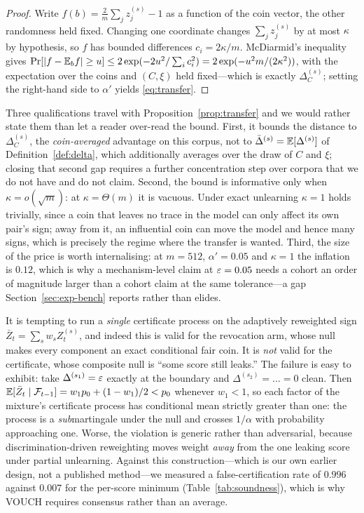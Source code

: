 \begin{proof}
Write $f(b) = \tfrac2m\sum_j z_j^{(s)} - 1$ as a function of the coin vector, the
other randomness held fixed. Changing one coordinate changes $\sum_j z_j^{(s)}$ by at
most $\kappa$ by hypothesis, so $f$ has bounded differences $c_i = 2\kappa/m$.
McDiarmid's inequality gives
$\Pr[|f - \mathbb{E}_b f| \ge u] \le 2\exp(-2u^2/\sum_i c_i^2) = 2\exp(-u^2 m/(2\kappa^2))$,
with the expectation over the coins and $(C,\xi)$ held fixed---which is exactly
$\Delta^{(s)}_C$; setting the right-hand side to $\alpha'$ yields
\eqref{eq:transfer}.
\end{proof}

Three qualifications travel with Proposition~\ref{prop:transfer} and we would rather
state them than let a reader over-read the bound. First, it bounds the distance to
$\Delta^{(s)}_C$, the \emph{coin-averaged} advantage on this corpus, not to
$\bar\Delta^{(s)} = \mathbb{E}[\Delta^{(s)}]$ of Definition~\ref{def:delta}, which
additionally averages over the draw of $C$ and $\xi$; closing that second gap requires
a further concentration step over corpora that we do not have and do not claim.
Second, the bound is informative only when $\kappa = o(\sqrt m)$: at
$\kappa = \Theta(m)$ it is vacuous. Under exact unlearning $\kappa = 1$ holds
trivially, since a coin that leaves no trace in the model can only affect its own
pair's sign; away from it, an influential coin can move the model and hence many
signs, which is precisely the regime where the transfer is wanted. Third, the size of
the price is worth internalising: at $m=512$, $\alpha'=0.05$ and $\kappa=1$ the
inflation is $0.12$, which is why a mechanism-level claim at $\varepsilon = 0.05$ needs a
cohort an order of magnitude larger than a cohort claim at the same tolerance---a gap
Section~\ref{sec:exp-bench} reports rather than elides.

\begin{remark}\label{rem:mixture}
It is tempting to run a \emph{single} certificate process on the adaptively reweighted
sign $\bar Z_t = \sum_s w_s Z_t^{(s)}$, and indeed this is valid for the revocation arm,
whose null makes every component an exact conditional fair coin. It is \emph{not}
valid for the certificate, whose composite null is ``some score still leaks.'' The
failure is easy to exhibit: take $\Delta^{(s_1)} = \varepsilon$ exactly at the boundary and
$\Delta^{(s_2)} = \dots = 0$ clean. Then
$\mathbb{E}[\bar Z_t \mid \mathcal{F}_{t-1}] = w_1 p_0 + (1 - w_1)/2 < p_0$ whenever $w_1 < 1$, so
each factor of the mixture's certificate process has conditional mean strictly greater
than one: the process is a \emph{sub}martingale under the null and crosses $1/\alpha$
with probability approaching one. Worse, the violation is generic rather than
adversarial, because discrimination-driven reweighting moves weight \emph{away} from
the one leaking score under partial unlearning. Against this construction---which is
our own earlier design, not a published method---we measured a false-certification
rate of $0.996$ against $0.007$ for the per-score minimum
(Table~\ref{tab:soundness}), which is why VOUCH requires consensus rather than an
average.
\end{remark}

